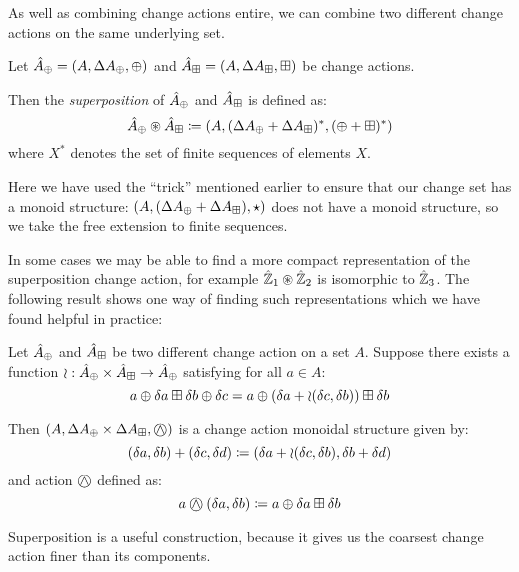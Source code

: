 As well as combining change actions entire, we can combine two different
change actions on the same underlying set.

\begin{defn}[Superposition]
  Let $\hat{A}_\oplus = (A,\Delta A_\oplus,\oplus)$ and $\hat{A}_\boxplus =
  (A,\Delta A_\boxplus,\boxplus)$ be change actions.

  Then the \textit{superposition} of $\hat{A}_\oplus$ and $\hat{A}_\boxplus$ is defined as:
  $$\hat{A}_\oplus \circledast \hat{A}_\boxplus \coloneqq (A,
    (\Delta A_\oplus + \Delta A_\boxplus)^\ast,(\oplus + \boxplus)^\ast)$$
  where $X^\ast$ denotes the set of finite sequences of elements $X$.
\end{defn}

Here we have used the ``trick'' mentioned earlier to ensure that our change
set has a monoid structure: $(A,(\Delta A_\oplus +
  \Delta A_\boxplus),\star)$ does not have a monoid structure, so we take
the free extension to finite sequences.

In some cases we may be able to find a more compact representation of the
superposition change action, for example $\hat{\mathbb{Z}}_1 \circledast \hat{\mathbb{Z}}_2$ is
isomorphic to $\hat{\mathbb{Z}}_3$. The following result shows one way of finding such representations which
we have found helpful in practice:

\begin{prop}
  Let $\hat{A}_\oplus$ and $\hat{A}_\boxplus$ be two different change action on
  a set $A$. Suppose there exists a function
  $\wr : \hat{A}_\oplus \times \hat{A}_\boxplus \rightarrow \hat{A}_\oplus$ satisfying for
  all $a \in A$:
  $$
    a \oplus \delta a \boxplus \delta b \oplus \delta c
    = a \oplus (\delta a + \wr(\delta c,\delta b)) \boxplus \delta b
  $$

  Then $\cstruct{A}{\changes{A}_\cplus \times \changes{A}_\cpluss}{\cplussym{\wedge}}$
  is a change action monoidal structure given by:
  $$
    (\delta a, \delta b) + (\delta c, \delta d) \coloneqq
    (\delta a + \wr(\delta c, \delta b), \delta b + \delta d)
  $$
  and action $\cplussym{\wedge}$ defined as:
  $$
    a \cplussym{\wedge} (\change{a}, \change{b}) \defeq a \cplus \change{a} \cpluss \change{b}
  $$
\end{prop}

Superposition is a useful construction, because it gives us the coarsest
change action finer than its components.

